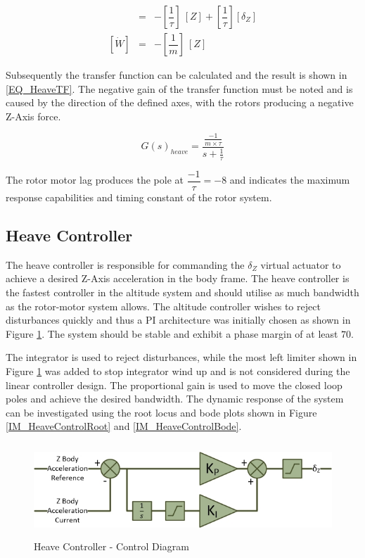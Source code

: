 	 \begin{eqnarray}
	 [\dot{Z}] &=& - [\dfrac{1}{\tau}] \ [Z] + [\dfrac{1}{\tau}] [\delta_Z]\label{EQ_HeaveStateSpace1}\\\label{EQ_HeaveStateSpace11}
	 [\dot{W}] &=& - [\dfrac{1}{m}] \ [Z]\label{EQ_HeaveStateSpace2}
	 \end{eqnarray}
	 
	 Subsequently the transfer function can be calculated and the result is shown in \eqref{EQ_HeaveTF}. The negative gain of the transfer function must be noted and is caused by the direction of the defined axes, with the rotors producing a negative Z-Axis force.
	 
	 \begin{equation}
	 G(s)_{heave} = \frac{\frac{-1}{m \times \tau}}{s + \frac{1}{\tau}}\label{EQ_HeaveTF}
	 \end{equation}
	 
	 The rotor motor lag produces the pole at $\dfrac{-1}{\tau} = -8$ and indicates the maximum response capabilities and timing constant of the rotor system.
	 
	 \subsection{Heave Controller}
	 The heave controller is responsible for commanding the $\delta_Z$ virtual actuator to achieve a desired Z-Axis acceleration in the body frame. The heave controller is the fastest controller in the altitude system and should utilise as much bandwidth as the rotor-motor system allows. The altitude controller wishes to reject disturbances quickly and thus a PI architecture was initially chosen as shown in Figure \ref{IM_HeaveController}. The system should be stable and exhibit a phase margin of at least $70$\textdegree.
	 
	 The integrator is used to reject disturbances, while the most left limiter shown in Figure \ref{IM_HeaveController} was added to stop integrator wind up and is not considered during the linear controller design. The proportional gain is used to move the closed loop poles and achieve the desired bandwidth. The dynamic response of the system can be investigated using the root locus and bode plots shown in Figure \ref{IM_HeaveControlRoot} and \ref{IM_HeaveControlBode}. 
	 
	 \begin{figure}[H]
	 	\centering
	 	\includegraphics[height = 3.5cm]{../References/Diagrams/HeaveController.jpg}
	 	\caption{Heave Controller -  Control Diagram}
	 	\label{IM_HeaveController}
	 \end{figure}
	 

